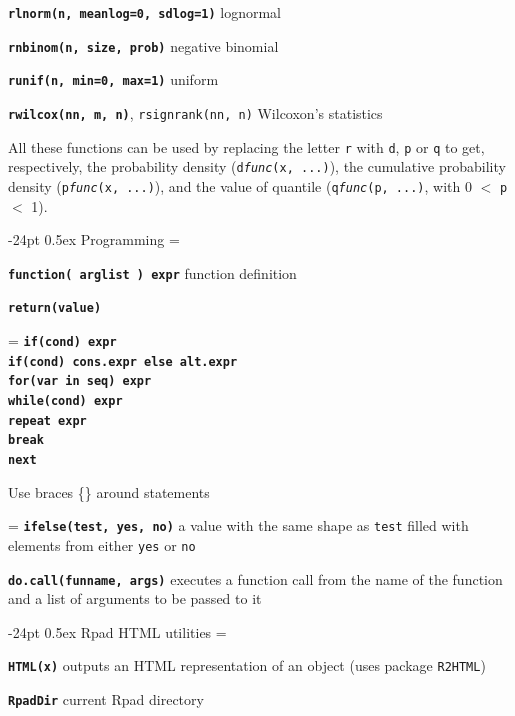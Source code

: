 \documentclass[10pt,landscape]{article}
\makeatletter
\renewcommand\section{\@startsection{section}{1}{0mm}%
                                     {-24pt}%
                                     {0.5ex}%
                                {\color{blue}\normalfont\large\bfseries}}
\newcommand{\code}{\texttt}
\newcommand{\bcode}[1]{\texttt{\textbf{#1}}}
\makeatother
\begin{document}
\begin{multicols}{3}
\bcode{rlnorm(n, meanlog=0, sdlog=1)} lognormal  

\bcode{rnbinom(n, size, prob)} negative binomial  

\bcode{runif(n, min=0, max=1)} uniform  

\bcode{rwilcox(nn, m, n)}, \code{rsignrank(nn, n)} Wilcoxon's statistics  

All these functions can be used by replacing the letter \code{r} with
\code{d}, \code{p} or \code{q} to get, respectively, the probability
density (\code{d\textsl{func}(x, ...)}), the cumulative probability
density (\code{p\textsl{func}(x, ...)}), and the value of quantile
(\code{q\textsl{func}(p, ...)}, with 0 $<$ \code{p} $<$ 1).





\section{Programming}
\everypar={\hangindent=9mm}

\bcode{function( arglist ) expr} function definition

\bcode{return(value)}

\everypar={\hangindent=0mm}
\bcode{if(cond) expr\\
if(cond) cons.expr  else  alt.expr\\
for(var in seq) expr\\
while(cond) expr\\
repeat expr\\
break\\
next}

Use braces \{\} around statements


\everypar={\hangindent=9mm}
\bcode{ifelse(test, yes, no)} a value with the same shape as \code{test} filled with elements
from either \code{yes} or \code{no} 

\bcode{do.call(funname, args)} executes a function call from the name of
  the function and a list of arguments to be passed to it



\section{\color{blue}Rpad HTML utilities}
\everypar={\hangindent=9mm}

\bcode{HTML(x)} outputs an HTML representation of an object (uses
package \code{R2HTML})

\bcode{RpadDir} current Rpad directory


\end{multicols}
\end{document}
